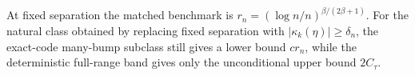 At fixed separation the matched benchmark is \(r_n=(\log n/n)^{\beta/(2\beta+1)}\). For the natural class obtained by replacing fixed separation with \(|\kappa_k(\eta)|\ge\delta_n\), the exact-code many-bump subclass still gives a lower bound \(cr_n\), while the deterministic full-range band gives only the unconditional upper bound \(2C_\tau\).